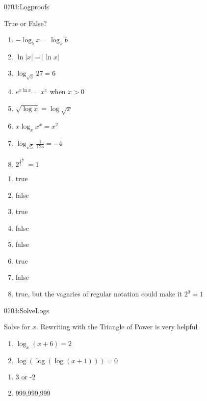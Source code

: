 \begin{defproblem}{0703:Logproofs}
\begin{onlyproblem}
True or False?
\begin{enumerate}
\item $-\log_b{x} = \log_x{b}$ 
\item $\ln{|x|} = |\ln{x}|$
\item $\log_{\sqrt{3}}{27} =6$
\item $e^{x\ln{x}} = x^x$ when $x>0$
\item $\sqrt{\log{x}} = \log{\sqrt{x}}$
\item $x\log_x{x^x} = x^2$
\item $\log_{\sqrt{5}}{\frac{1}{125}} = -4$
\item ${2^{\frac{1}{2}^{\frac{1}{2}^{\iddots}}}} = 1$
\end{enumerate}
\end{onlyproblem}

\begin{onlysolution}
\begin{enumerate}
\item true
\item false
\item true
\item false
\item false
\item true
\item false
\item true, but the vagaries of regular notation could make it $2^0=1$
\end{enumerate}
\end{onlysolution}
\end{defproblem}



\begin{defproblem}{0703:SolveLogs}
\begin{onlyproblem}
Solve for $x$.  Rewriting with the Triangle of Power is very helpful
\begin{enumerate}
\item $\log_x{(x+6)}=2$
\item $\log{\left(\log{\left(\log{(x+1)} \right)} \right)} = 0$ 
\end{enumerate}
\end{onlyproblem}
\begin{onlysolution}
\begin{enumerate}
\item 3 or -2
\item 999,999,999
\end{enumerate}
\end{onlysolution}
\end{defproblem}


